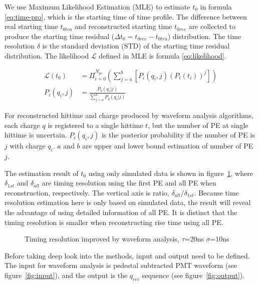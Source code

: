 We use Maximum Likelihood Estimation (MLE) to estimate $t_{0}$ in formula \eqref{eq:time-pro}, which is the starting time of time profile. The difference between real starting time $t_{0tru}$ and reconstructed starting time $t_{0rec}$ are collected to produce the starting time residual ($\Delta t_{0}=t_{0rec}-t_{0tru}$) distribution. The time resolution $\delta$ is the standard deviation (STD) of the starting time residual distribution. The likelihood $\mathcal{L}$ defined in MLE is formula \eqref{eq:likelihood}. 

\begin{align}
    \mathcal{L}(t_{0}) &= \Pi_{i=0}^{N_{pe}}\left(\sum_{j=a}^{b}[P_{i}(q_{i},j)(P_{t}(t_{i}))^{j}]\right)
    \label{eq:likelihood} \\
    P_{i}(q_{i},j) &= \frac{P_{q}(q_{i}|j)}{\sum_{j=a}^{b}P_{q}(q_{i}|j)}
\end{align}

For reconstructed hittime and charge produced by waveform analysis algorithms, each charge $q$ is registered to a single hittime $t$, but the number of PE at single hittime is uncertain. $P_{i}(q_{i},j)$ is the posterior probability if the number of PE is $j$ with charge $q_{i}$. $a$ and $b$ are upper and lower bound estimation of number of PE $j$. 

The estimation result of $t_{0}$ using only simulated data is shown in figure~\ref{fig:reso-diff}, where $\delta_{1st}$ and $\delta_{all}$ are timing resolution using the first PE and all PE when reconstruction, respectively. The vertical axis is ratio, $\delta_{all}/\delta_{1st}$. Because time resolution estimation here is only based on simulated data, the result will reveal the advantage of using detailed information of all PE. It is distinct that the timing resolution is smaller when reconstructing rise time using all PE. 

\begin{figure}[H]
    \centering
    \scalebox{0.5}{}
    \caption{\label{fig:reso-diff} Timing resolution improved by waveform analysis, $\tau$=20ns $\sigma$=10ns}
\end{figure}

Before taking deep look into the methods, input and output need to be defined. The input for waveform analysis is pedestal subtracted PMT waveform (see figure~\ref{fig:input}), and the output is the $q_{rec}$ sequence (see figure~\ref{fig:output}). 

